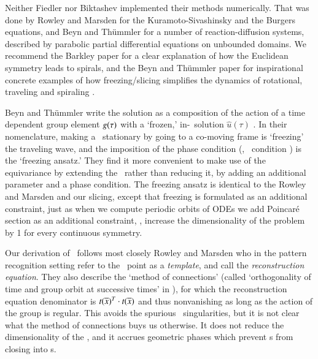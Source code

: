 \documentclass[preprint,number,sort&compress]{elsarticle}
\begin{document}
Neither Fiedler \etal{} nor Biktashev
\etal{} implemented their methods numerically.
That was done by Rowley and Marsden for the
Kuramoto-Sivashinsky and the
Burgers equations, and Beyn and
Th\"ummler for a number of
reaction-diffusion systems, described by parabolic partial
differential equations on unbounded domains. We recommend the
Barkley paper for a clear explanation of how
the Euclidean symmetry leads to spirals, and the Beyn and
Th\"ummler paper for inspirational concrete
examples of how freezing/\-slicing simplifies the
dynamics of rotational, traveling and spiraling \reqva.

Beyn and Th\"ummler write the solution as a composition of
the action of a time dependent group element $g(\tau)$ with
a `frozen,' in-\slice\ solution $\hat{u}(\tau)$
. In their nomenclature, making a \reqv\ stationary
by going to a co-moving frame is `freezing' the
traveling wave, and the imposition of the phase
condition (\ie, \slice\ condition ) is the
`freezing ansatz.' They find it more convenient to make use
of the equivariance by extending the \statesp\ rather than
reducing it, by adding an additional parameter and a phase
condition.
The freezing ansatz is identical
to the Rowley and Marsden and our
slicing, except that freezing is formulated as an
additional constraint, just as when we compute periodic
orbits of ODEs we add Poincar\'e section as an additional
constraint, \ie, increase the dimensionality of the problem
by 1 for every continuous symmetry.

Our derivation of \mslices\ follows most closely
Rowley and Marsden who in the
pattern recognition setting refer to the \slice\ point as a
{\em template}, and call  the {\em reconstruction
equation}. They also describe the `method
of connections' (called `orthogonality of time and group
orbit at successive times' in ), for which the
reconstruction equation  denominator is
$t(\overline{x})^T \cdot t(\overline{x})$ and thus
nonvanishing as long as the action of the group is regular.
This avoids the spurious \slice\ singularities, but it is not
clear what the method of connections buys us otherwise. It
does not reduce the dimensionality of the \statesp, and it
accrues geometric phases which prevent \rpo s from closing
into \po s.
\end{document}
